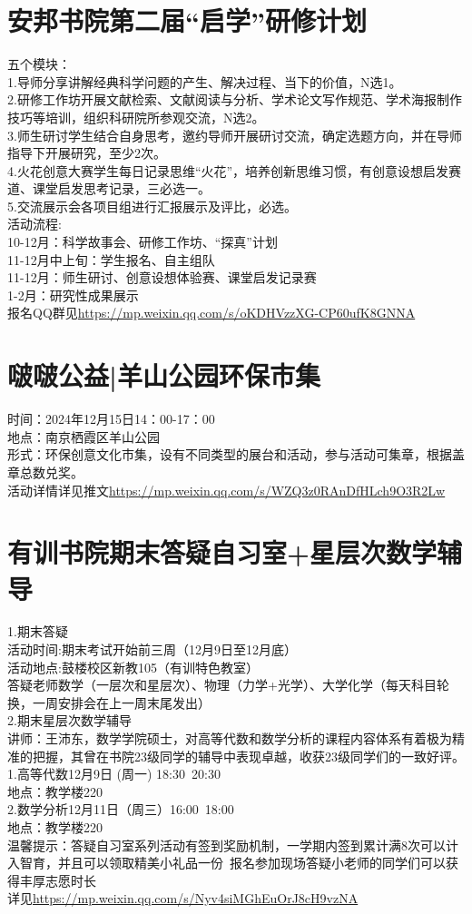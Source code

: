 \documentclass[letterpaper, 12pt]{article}
\begin{document}
\begin{multicols}{2}
\section{安邦书院第二届“启学”研修计划}
五个模块：\\
1.导师分享讲解经典科学问题的产生、解决过程、当下的价值，N选1。\\
2.研修工作坊开展文献检索、文献阅读与分析、学术论文写作规范、学术海报制作技巧等培训，组织科研院所参观交流，N选2。\\
3.师生研讨学生结合自身思考，邀约导师开展研讨交流，确定选题方向，并在导师指导下开展研究，至少2次。\\
4.火花创意大赛学生每日记录思维“火花”，培养创新思维习惯，有创意设想启发赛道、课堂启发思考记录，三必选一。\\
5.交流展示会各项目组进行汇报展示及评比，必选。\\
活动流程:\\
10-12月：科学故事会、研修工作坊、“探真”计划\\
11-12月中上旬：学生报名、自主组队\\
11-12月：师生研讨、创意设想体验赛、课堂启发记录赛\\
1-2月：研究性成果展示\\
报名QQ群见\url{https://mp.weixin.qq.com/s/oKDHVzzXG-CP60ufK8GNNA}

\section{啵啵公益|羊山公园环保市集}
时间：2024年12月15日14：00-17：00\\
地点：南京栖霞区羊山公园\\
形式：环保创意文化市集，设有不同类型的展台和活动，参与活动可集章，根据盖章总数兑奖。\\
活动详情详见推文\url{https://mp.weixin.qq.com/s/WZQ3z0RAnDfHLch9O3R2Lw}

\section{有训书院期末答疑自习室+星层次数学辅导}
1.期末答疑\\
活动时间:期末考试开始前三周（12月9日至12月底）\\
活动地点:鼓楼校区新教105（有训特色教室）\\
答疑老师数学（一层次和星层次）、物理（力学+光学）、大学化学（每天科目轮换，一周安排会在上一周末尾发出）\\
2.期末星层次数学辅导\\
讲师：王沛东，数学学院硕士，对高等代数和数学分析的课程内容体系有着极为精准的把握，其曾在书院23级同学的辅导中表现卓越，收获23级同学们的一致好评。\\
1.高等代数12月9日 (周一) 18:30~20:30\\
地点：教学楼220\\
2.数学分析12月11日（周三）16:00~18:00\\
地点：教学楼220\\
温馨提示：答疑自习室系列活动有签到奖励机制，一学期内签到累计满8次可以计入智育，并且可以领取精美小礼品一份~报名参加现场答疑小老师的同学们可以获得丰厚志愿时长~\\
详见\url{https://mp.weixin.qq.com/s/Nyv4siMGhEuOrJ8cH9vzNA}

\end{multicols} 
\end{document}
